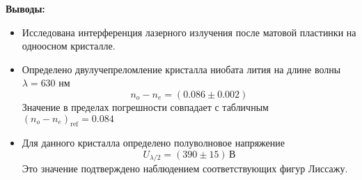 \documentclass{beamer}
\begin{document}
	\begin{frame}
		{\large \textbf{Выводы:}}
		
		\begin{itemize}
			\item Исследована интерференция лазерного излучения после матовой пластинки на одноосном кристалле.
			\item Определено двулучепреломление кристалла ниобата лития на длине волны $\lambda = 630$ нм
			$$ n_o - n_e = (0.086 \pm 0.002) $$
			Значение в пределах погрешности совпадает с табличным $(n_o - n_e)_{\mathrm{ref}} = 0.084$
			\item Для данного кристалла определено полуволновое напряжение
			$$ U_{\lambda/2} = (390 \pm 15)\, \text{В} $$
			Это значение подтверждено наблюдением соответствующих фигур Лиссажу.
		\end{itemize}
	\end{frame}
\end{document}
